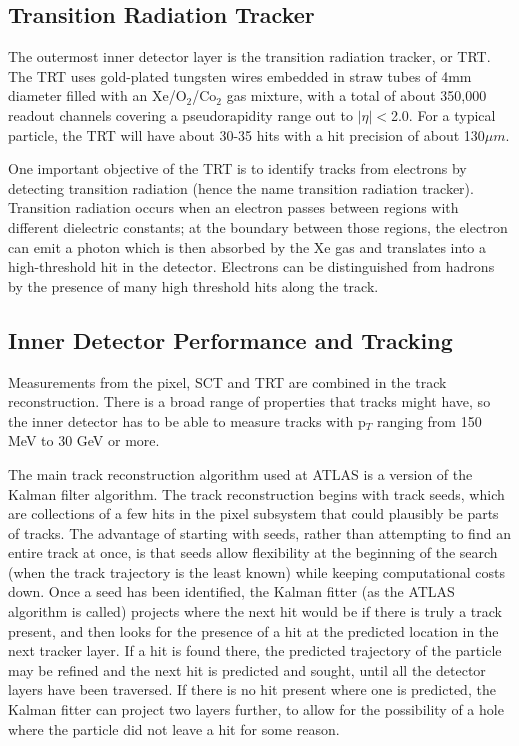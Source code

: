 \subsection{Transition Radiation Tracker}
The outermost inner detector layer is the transition radiation tracker, or TRT.  The TRT uses gold-plated tungsten wires embedded in straw tubes of 4mm diameter filled with an Xe/O$_2$/Co$_2$ gas mixture, with a total of about 350,000 readout channels covering a pseudorapidity range out to $|\eta|<$2.0.  For a typical particle, the TRT will have about 30-35 hits with a hit precision of about 130$\mu m$.

One important objective of the TRT is to identify tracks from electrons by detecting transition radiation (hence the name transition radiation tracker).  Transition radiation occurs when an electron passes between regions with different dielectric constants; at the boundary between those regions, the electron can emit a photon which is then absorbed by the Xe gas and translates into a high-threshold hit in the detector.  Electrons can be distinguished from hadrons by the presence of many high threshold hits along the track.

 
\subsection{Inner Detector Performance and Tracking}
Measurements from the pixel, SCT and TRT are combined in the track reconstruction.  There is a broad range of properties that tracks might have, so the inner detector has to be able to measure tracks with p$_T$ ranging from 150 MeV to 30 GeV or more.   

The main track reconstruction algorithm used at ATLAS is a version of the Kalman filter algorithm.  The track reconstruction begins with track seeds, which are collections of a few hits in the pixel subsystem that could plausibly be parts of tracks.  The advantage of starting with seeds, rather than attempting to find an entire track at once, is that seeds allow flexibility at the beginning of the search (when the track trajectory is the least known) while keeping computational costs down.  Once a seed has been identified, the Kalman fitter (as the ATLAS algorithm is called) projects where the next hit would be if there is truly a track present, and then looks for the presence of a hit at the predicted location in the next tracker layer.  If a hit is found there, the predicted trajectory of the particle may be refined and the next hit is predicted and sought, until all the detector layers have been traversed. If there is no hit present where one is predicted, the Kalman fitter can project two layers further, to allow for the possibility of a hole where the particle did not leave a hit for some reason. 

